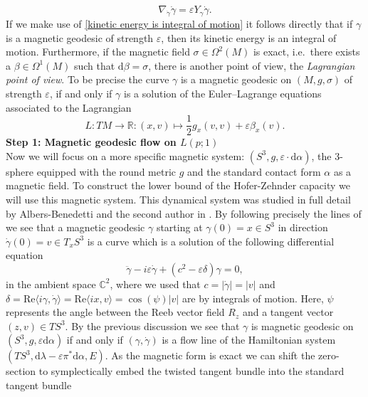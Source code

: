\documentclass[12pt]{article}
\def\gc{{\gamma}}
\def\dgc{\dot{\gc}}
\newcommand{\C}{\mathbb{C}} %
\newcommand{\R}{\mathbb{R}} %
\newcommand{\dd}{\mathrm{d}}
\begin{document}
 \begin{equation}\label{general equation for magnetic geodesics of strength s}
	\nabla_{\dgc}\dgc=\varepsilon Y_{\gc}\dgc.
\end{equation} 
If we make use of \eqref{kinetic energy is integral of motion} it follows directly that if $\gc$ is a magnetic geodesic of strength $\varepsilon$, then its kinetic energy is an integral of motion. Furthermore, if the magnetic field $\sigma\in \Omega^2(M)$ is exact, i.e.\ there exists a $\beta\in \Omega^1(M)$ such that $ \dd\beta=\sigma$, there is another point of view, the \emph{Lagrangian point of view}. To be precise the curve $\gc$ is a magnetic geodesic on $(M, g, \sigma)$ of strength $\varepsilon$, if and only if $\gc$ is a solution of the Euler--Lagrange equations associated to the Lagrangian 
\begin{equation*}
    L:TM\longrightarrow\R:(x,v)\mapsto\frac{1}{2}g_x(v,v)+ \varepsilon \beta_x(v). 
\end{equation*}
\noindent
\textbf{Step 1: Magnetic geodesic flow on $L(p;1)$}\\
Now we will focus on a more specific magnetic system: $\left(S^3, g, \varepsilon\cdot\dd\alpha \right)$, the 3-sphere equipped with the round metric $g$ and the standard contact form $\alpha$ as a magnetic field.  To construct the lower bound of the Hofer-Zehnder capacity we will use this magnetic system. This dynamical system was studied in full detail by Albers-Benedetti and the second author in \cite{ABM}. By following precisely the lines of \cite[Eq. (3.2)]{ABM}  we see that a magnetic geodesic $\gamma$ starting at $\gamma(0)=x\in S^3$ in direction $\dot \gamma (0)=v\in T_xS^3$ is a curve which is a solution of the following differential equation
\begin{equation}\label{e1}
\ddot \gamma -i\varepsilon\dot \gamma +(c^2 -\varepsilon \delta)\gamma =0,
\end{equation}
in the ambient space $\C^2$, where we used that \( c=\vert \dot{\gamma} \vert=\vert v \vert \) and \( \delta=\mathrm{Re} \langle i\gamma, \dot{\gamma} \rangle = \mathrm{Re} \langle ix, v \rangle = \cos(\psi) |v| \) are by \cite{ABM} integrals of motion. Here, \( \psi \) represents the angle between the Reeb vector field \( R_z \) and a tangent vector \( (z,v) \in TS^3 \).
 By the previous discussion we see that $\gc$ is magnetic geodesic on $(S^3,g, \varepsilon\dd\alpha)$ if and only if $(\gc, \dgc)$ is a flow line of the Hamiltonian system $(TS^3, \dd\lambda-\varepsilon\pi^*\dd\alpha, E)$.  
As the magnetic form is exact we can shift the zero-section to symplectically embed the twisted tangent bundle into the standard tangent bundle
\end{document}
